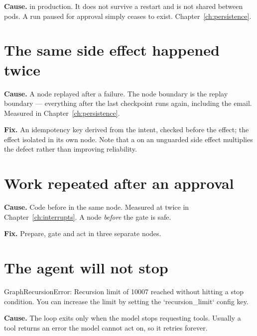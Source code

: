 \textbf{Cause.}  in production. It does not survive a restart
and is not shared between pods. A run paused for approval simply ceases to exist.
Chapter~\ref{ch:persistence}.

\section{The same side effect happened twice}
\label{sec:tsG}

\textbf{Cause.} A node replayed after a failure. The node boundary is the replay
boundary --- everything after the last checkpoint runs again, including the
email. Measured in Chapter~\ref{ch:persistence}.

\textbf{Fix.} An idempotency key derived from the intent, checked before the
effect; the effect isolated in its own node. Note that a  on an
unguarded side effect multiplies the defect rather than improving reliability.

\section{Work repeated after an approval}
\label{sec:tsH}

\textbf{Cause.} Code before  in the same node. Measured at twice
in Chapter~\ref{ch:interrupts}. A node \emph{before} the gate is safe.

\textbf{Fix.} Prepare, gate and act in three separate nodes.

\section{The agent will not stop}
\label{sec:tsI}

\begin{console}
GraphRecursionError: Recursion limit of 10007 reached without hitting a stop
condition. You can increase the limit by setting the `recursion_limit`
config key.
\end{console}

\textbf{Cause.} The loop exits only when the model stops requesting tools. Usually
a tool returns an error the model cannot act on, so it retries forever.

